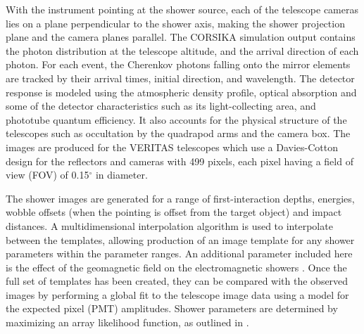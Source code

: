 \documentclass[main.tex]{subfiles}
\begin{document}
With the instrument pointing at the shower source, each of the telescope cameras lies on a plane perpendicular to the shower axis, making the shower projection plane and the camera planes parallel. The CORSIKA simulation output contains the photon distribution at the telescope altitude, and the arrival direction of each photon. For each event, the Cherenkov photons falling onto the mirror elements are tracked by their arrival times, initial direction, and wavelength. The detector response is modeled using the atmospheric density profile, optical absorption and some of the detector characteristics such as its light-collecting area, and phototube quantum efficiency. It also accounts for the physical structure of the telescopes such as occultation by the quadrapod arms and the camera box. The images are produced for the VERITAS telescopes which use a Davies-Cotton design for the reflectors and cameras with 499 pixels, each pixel having a field of view (FOV) of 0.15$^\circ$ in diameter.

The shower images are generated for a range of first-interaction depths, energies, wobble offsets (when the pointing is offset from the target object) and impact distances. A multidimensional interpolation algorithm is used to interpolate between the templates, allowing production of an image template for any shower parameters within the parameter ranges. An additional parameter included here is the effect of the geomagnetic field on the electromagnetic showers \cite{Vincent:2015bnj}.
Once the full set of templates has been created, they can be compared with the observed images by performing a global fit to the telescope image data using a model for the expected pixel (PMT) amplitudes. Shower parameters are determined by maximizing an array likelihood function, as outlined in \cite{deNaurois}.
\end{document}
